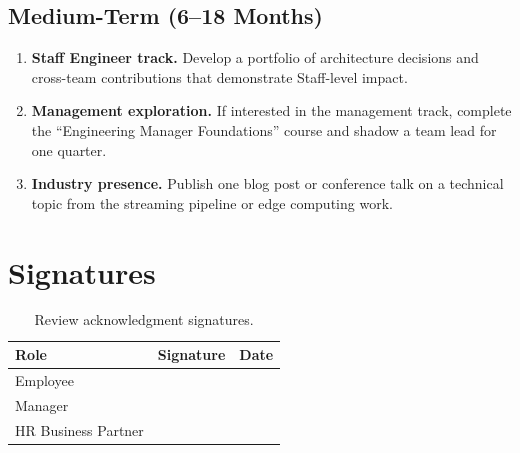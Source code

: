 \documentclass[
    language=english,
    doctype=performance-review,
    institution=none,
]{../../omnilatex}
\begin{document}
\subsection{Medium-Term (6--18 Months)}

\begin{enumerate}
    \item \textbf{Staff Engineer track.} Develop a portfolio of
        architecture decisions and cross-team contributions that
        demonstrate Staff-level impact.
    \item \textbf{Management exploration.} If interested in the management
        track, complete the ``Engineering Manager Foundations'' course and
        shadow a team lead for one quarter.
    \item \textbf{Industry presence.} Publish one blog post or conference
        talk on a technical topic from the streaming pipeline or edge
        computing work.
\end{enumerate}

\section{Signatures}

\begin{table}[h]
    \centering
    \begin{tabular}{lll}
        \toprule
        \textbf{Role} & \textbf{Signature} & \textbf{Date} \\
        \midrule
        Employee    & \underline{\hspace{5cm}} & \underline{\hspace{3cm}} \\
        Manager     & \underline{\hspace{5cm}} & \underline{\hspace{3cm}} \\
        HR Business Partner & \underline{\hspace{5cm}} & \underline{\hspace{3cm}} \\
        \bottomrule
    \end{tabular}
    \caption{Review acknowledgment signatures.}
\end{table}

\printbibliography[heading=none]
\end{document}
